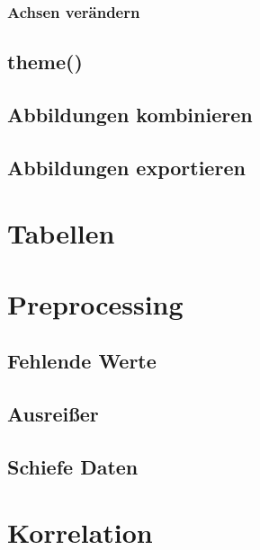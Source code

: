 \documentclass[
]{book}
\begin{document}
\hypertarget{achsen-veruxe4ndern}{%
\subsection{Achsen verändern}\label{achsen-veruxe4ndern}}

\hypertarget{theme}{%
\section{theme()}\label{theme}}

\hypertarget{abbildungen-kombinieren}{%
\section{Abbildungen kombinieren}\label{abbildungen-kombinieren}}

\hypertarget{abbildungen-exportieren}{%
\section{Abbildungen exportieren}\label{abbildungen-exportieren}}

\hypertarget{tabellen}{%
\chapter{Tabellen}\label{tabellen}}

\hypertarget{preprocessing}{%
\chapter{Preprocessing}\label{preprocessing}}

\hypertarget{fehlende-werte}{%
\section{Fehlende Werte}\label{fehlende-werte}}

\hypertarget{ausreiuxdfer}{%
\section{Ausreißer}\label{ausreiuxdfer}}

\hypertarget{schiefe-daten}{%
\section{Schiefe Daten}\label{schiefe-daten}}

\hypertarget{korrelation}{%
\chapter{Korrelation}\label{korrelation}}
\end{document}
